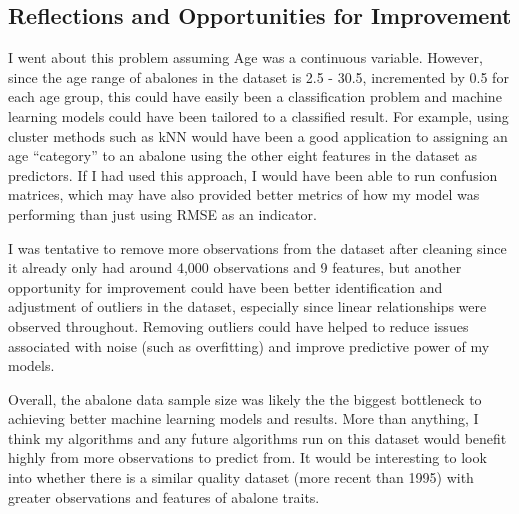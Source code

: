 \documentclass[
]{article}
\begin{document}
\hypertarget{reflections-and-opportunities-for-improvement}{%
\subsection{Reflections and Opportunities for
Improvement}\label{reflections-and-opportunities-for-improvement}}

I went about this problem assuming Age was a continuous variable.
However, since the age range of abalones in the dataset is 2.5 - 30.5,
incremented by 0.5 for each age group, this could have easily been a
classification problem and machine learning models could have been
tailored to a classified result. For example, using cluster methods such
as kNN would have been a good application to assigning an age
``category'' to an abalone using the other eight features in the dataset
as predictors. If I had used this approach, I would have been able to
run confusion matrices, which may have also provided better metrics of
how my model was performing than just using RMSE as an indicator.

I was tentative to remove more observations from the dataset after
cleaning since it already only had around 4,000 observations and 9
features, but another opportunity for improvement could have been better
identification and adjustment of outliers in the dataset, especially
since linear relationships were observed throughout. Removing outliers
could have helped to reduce issues associated with noise (such as
overfitting) and improve predictive power of my models.

Overall, the abalone data sample size was likely the the biggest
bottleneck to achieving better machine learning models and results. More
than anything, I think my algorithms and any future algorithms run on
this dataset would benefit highly from more observations to predict
from. It would be interesting to look into whether there is a similar
quality dataset (more recent than 1995) with greater observations and
features of abalone traits.
\end{document}
